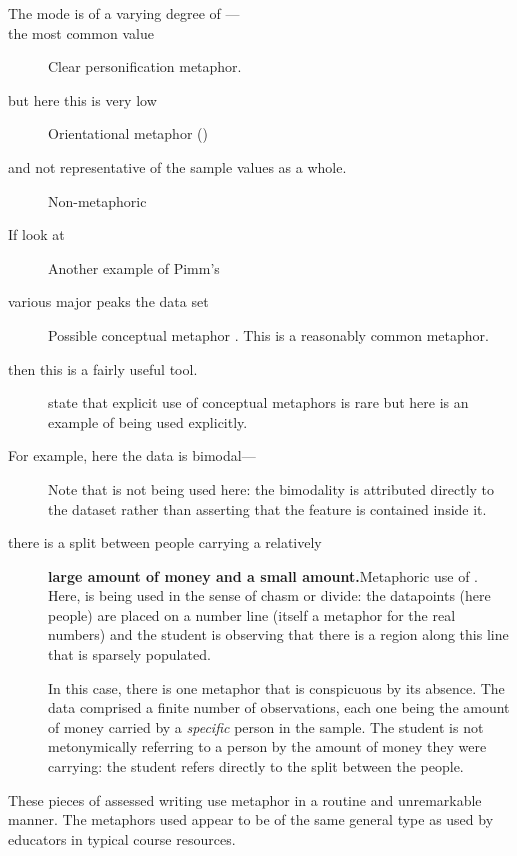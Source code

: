 \begin{description}
\item[The mode is of a varying degree of
  ---]\qquad {}
\item[ the most common value]\qquad Clear
  personification metaphor.
\item[but here this is very low]\qquad Orientational metaphor
  ()
\item[and not representative of the sample values as a whole.]\qquad
  Non-metaphoric
\item[If  look at]\qquad Another example of Pimm's
  \item[various major peaks  the data set] Possible
    conceptual metaphor .  This is a reasonably common metaphor.
\item[then this is a fairly useful tool.]\qquad{}
  state that explicit use of conceptual metaphors is rare but here is
  an example of  being used explicitly.
\item[For example, here the data is bimodal---]\qquad Note that
  is not being used here: the bimodality is attributed directly to the
  dataset rather than asserting that the feature is contained inside
  it.
\item[there is a split between people carrying a relatively]{\bf large
  amount of money and a small amount.}\qquad Metaphoric use of
  .  Here,  is being used in the sense
  of chasm or divide: the datapoints (here people) are placed on a
  number line (itself a metaphor for the real numbers) and the student
  is observing that there is a region along this line that is sparsely
  populated.

  In this case, there is one metaphor that is conspicuous by its
  absence.  The data comprised a finite number of observations, each
  one being the amount of money carried by a \emph{specific} person in
  the sample.  The student is not metonymically referring to a person
  by the amount of money they were carrying: the student refers
  directly to the split between the people.
\end{description}

\noindent These pieces of assessed writing use metaphor in a routine
and unremarkable manner.  The metaphors used appear to be of the same
general type as used by educators in typical course resources.

